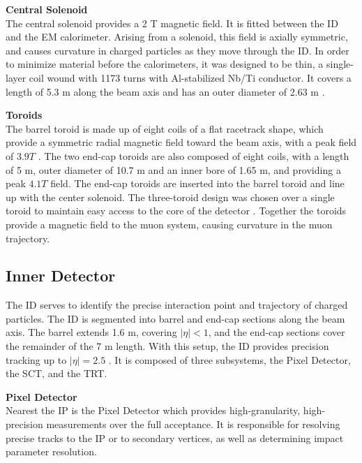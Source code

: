 \noindent\textbf{Central Solenoid}\\
\indent The central solenoid provides a 2 T magnetic field. It is fitted between the \gls{ID} and the \gls{EM} calorimeter. Arising from a solenoid, this field is axially symmetric, and causes curvature in charged particles as they move through the \gls{ID}. In order to minimize material before the calorimeters, it was designed to be thin, a single-layer coil wound with 1173 turns with Al-stabilized Nb/Ti conductor. It covers a length of 5.3 m along the beam axis and has an outer diameter of 2.63 m \cite{central-solenoid}.

\noindent\textbf{Toroids}\\
\indent The barrel toroid is made up of eight coils of a flat racetrack shape, which provide a symmetric radial magnetic field toward the beam axis, with a peak field of $\unit{3.9}{T}$ \cite{barrel-toroid}. The two end-cap toroids are also composed of eight coils, with a length of 5 m, outer diameter of 10.7 m and an inner bore of 1.65 m, and providing a peak $\unit{4.1}{T}$ field. The end-cap toroids are inserted into the barrel toroid and line up with the center solenoid. The three-toroid design was chosen over a single toroid to maintain easy access to the core of the detector \cite{endcap-toroid}. Together the toroids provide a magnetic field to the muon system, causing curvature in the muon trajectory.


\subsection{Inner Detector}  \label{ssec:innerdetector}


The \gls{ID} serves to identify the precise interaction point and trajectory of charged particles. The \gls{ID} is segmented into barrel and end-cap sections along the beam axis. The barrel extends 1.6 m, covering $|\eta| < 1$, and the end-cap sections cover the remainder of the 7 m length. With this setup, the \gls{ID} provides precision tracking up to $|\eta| = 2.5$ \cite{inner-detector-tdr}. It is composed of three subsystems, the Pixel Detector, the \gls{SCT}, and the \gls{TRT}.

\noindent\textbf{Pixel Detector}\\
\indent Nearest the \gls{IP} is the Pixel Detector which provides high-granularity, high-precision measurements over the full acceptance. It is responsible for resolving precise tracks to the \gls{IP} or to secondary vertices, as well as determining impact parameter resolution. 

